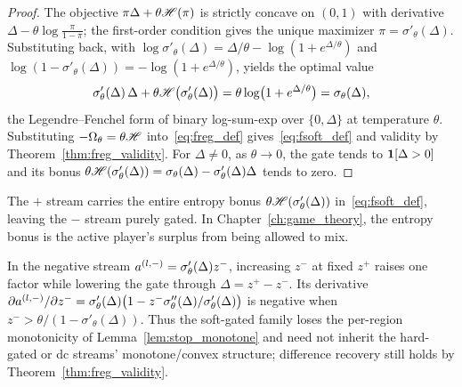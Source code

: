 \begin{proof}
The objective $\pi \Delta + \theta \mathscr{H}(\pi)$ is strictly concave on $(0,1)$ with derivative $\Delta - \theta \log\frac{\pi}{1-\pi}$; the first-order condition gives the unique maximizer $\pi = \sigma'_\theta(\Delta)$. Substituting back, with $\log \sigma'_\theta(\Delta) = \Delta/\theta - \log(1 + e^{\Delta/\theta})$ and $\log(1 - \sigma'_\theta(\Delta)) = -\log(1 + e^{\Delta/\theta})$, yields the optimal value
\begin{equation}
	\sigma'_\theta(\Delta)\, \Delta + \theta \mathscr{H}\bigl(\sigma'_\theta(\Delta)\bigr) = \theta \log\bigl( 1 + e^{\Delta/\theta} \bigr) = \sigma_\theta(\Delta),
	\label{eq:legendre_fenchel_softplus}
\end{equation}
the Legendre--Fenchel form of binary log-sum-exp over $\{0,\Delta\}$ at temperature $\theta$. Substituting $-\Omega_\theta=\theta \mathscr{H}$ into~\eqref{eq:freg_def} gives~\eqref{eq:fsoft_def} and validity by Theorem~\ref{thm:freg_validity}. For $\Delta\neq0$, as $\theta\to0$, the gate tends to $\mathbf{1}[\Delta>0]$ and its bonus $\theta \mathscr{H}(\sigma'_\theta(\Delta))=\sigma_\theta(\Delta)-\sigma'_\theta(\Delta)\Delta$ tends to zero.
\end{proof}

The $+$ stream carries the entire entropy bonus $\theta \mathscr{H}(\sigma'_\theta(\Delta))$ in~\eqref{eq:fsoft_def}, leaving the $-$ stream purely gated. In Chapter~\ref{ch:game_theory}, the entropy bonus is the active player's surplus from being allowed to mix.

\begin{remark}\label{rem:soft-monotone}
In the negative stream $a^{(l,-)}=\sigma'_\theta(\Delta)z^-$, increasing $z^-$ at fixed $z^+$ raises one factor while lowering the gate through $\Delta=z^+-z^-$. Its derivative $\partial a^{(l,-)}/\partial z^- = \sigma'_\theta(\Delta)\bigl(1-z^-\sigma''_\theta(\Delta)/\sigma'_\theta(\Delta)\bigr)$ is negative when $z^->\theta/(1-\sigma'_\theta(\Delta))$. Thus the soft-gated family loses the per-region monotonicity of Lemma~\ref{lem:stop_monotone} and need not inherit the hard-gated or \ac{dc} streams' monotone/convex structure; difference recovery still holds by Theorem~\ref{thm:freg_validity}.
\end{remark}

